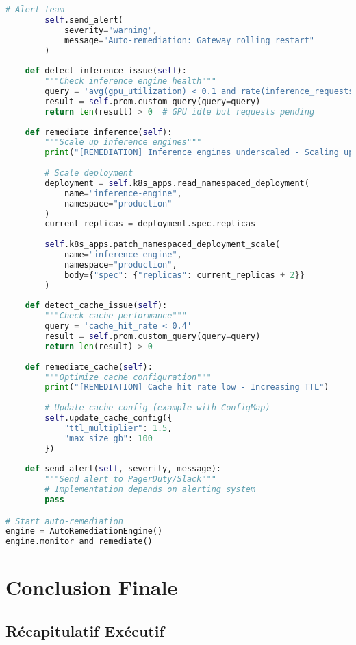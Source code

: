 \documentclass[12pt,a4paper]{article}
\begin{document}
\begin{lstlisting}[language=python, caption=Auto-Remediation Engine]
        # Alert team
        self.send_alert(
            severity="warning",
            message="Auto-remediation: Gateway rolling restart"
        )
    
    def detect_inference_issue(self):
        """Check inference engine health"""
        query = 'avg(gpu_utilization) < 0.1 and rate(inference_requests[5m]) > 10'
        result = self.prom.custom_query(query=query)
        return len(result) > 0  # GPU idle but requests pending
    
    def remediate_inference(self):
        """Scale up inference engines"""
        print("[REMEDIATION] Inference engines underscaled - Scaling up")
        
        # Scale deployment
        deployment = self.k8s_apps.read_namespaced_deployment(
            name="inference-engine",
            namespace="production"
        )
        current_replicas = deployment.spec.replicas
        
        self.k8s_apps.patch_namespaced_deployment_scale(
            name="inference-engine",
            namespace="production",
            body={"spec": {"replicas": current_replicas + 2}}
        )
    
    def detect_cache_issue(self):
        """Check cache performance"""
        query = 'cache_hit_rate < 0.4'
        result = self.prom.custom_query(query=query)
        return len(result) > 0
    
    def remediate_cache(self):
        """Optimize cache configuration"""
        print("[REMEDIATION] Cache hit rate low - Increasing TTL")
        
        # Update cache config (example with ConfigMap)
        self.update_cache_config({
            "ttl_multiplier": 1.5,
            "max_size_gb": 100
        })
    
    def send_alert(self, severity, message):
        """Send alert to PagerDuty/Slack"""
        # Implementation depends on alerting system
        pass

# Start auto-remediation
engine = AutoRemediationEngine()
engine.monitor_and_remediate()
\end{lstlisting}

\newpage
\section{Conclusion Finale}

\subsection{Récapitulatif Exécutif}
\end{document}

